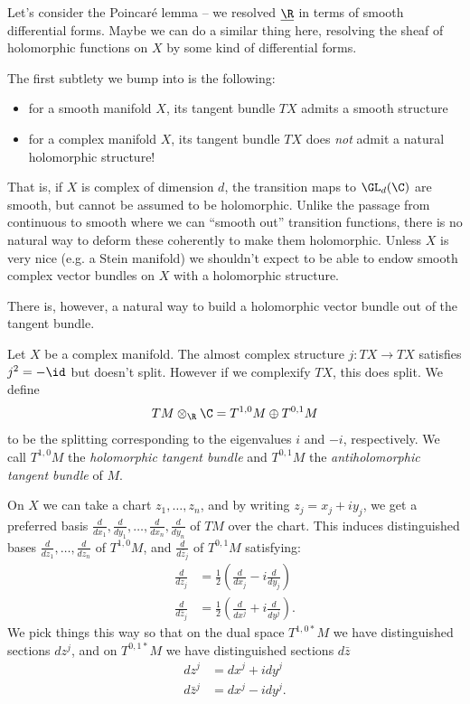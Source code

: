 \documentclass[11pt]{book}
\begin{document}
Let's consider the Poincar\'e lemma -- we resolved $\underline{\R}$ in terms of smooth differential forms. Maybe we can do a similar thing here, resolving the sheaf of holomorphic functions on $X$ by some kind of differential forms.

The first subtlety we bump into is the following:
\begin{itemize}
    \item for a smooth manifold $X$, its tangent bundle $TX$ admits a smooth structure
    \item for a complex manifold $X$, its tangent bundle $TX$ does \emph{not} admit a natural holomorphic structure!
\end{itemize}

That is, if $X$ is complex of dimension $d$, the transition maps to $\GL_d(\C)$ are smooth, but cannot be assumed to be holomorphic. Unlike the passage from continuous to smooth where we can ``smooth out'' transition functions, there is no natural way to deform these coherently to make them holomorphic. Unless $X$ is very nice (e.g. a Stein manifold) we shouldn't expect to be able to endow smooth complex vector bundles on $X$ with a holomorphic structure.

There is, however, a natural way to build a holomorphic vector bundle out of the tangent bundle.

\begin{definition} Let $X$ be a complex manifold. The almost complex structure $j \colon TX \to TX$ satisfies $j^2 = -\id$ but doesn't split. However if we complexify $TX$, this does split. We define
\begin{align*}
    TM \otimes_\R\C = T^{1,0}M \oplus T^{0,1}M
\end{align*}
to be the splitting corresponding to the eigenvalues $i$ and $-i$, respectively. We call $T^{1,0}M$ the \emph{holomorphic tangent bundle} and $T^{0,1}M$ the \emph{antiholomorphic tangent bundle} of $M$.
\end{definition}

\begin{remark} On $X$ we can take a chart $z_1, \ldots, z_n$, and by writing $z_j = x_j + iy_j$, we get a preferred basis $\frac{d}{dx_1}, \frac{d}{dy_1}, \ldots, \frac{d}{dx_n}, \frac{d}{dy_n}$ of $TM$ over the chart. This induces distinguished bases $\frac{d}{dz_1}, \ldots, \frac{d}{dz_n}$ of $T^{1,0}M$, and $\frac{d}{d \bar{z}_j}$ of $T^{0,1}M$ satisfying: 
\begin{align*}
    \frac{d}{dz_j} &= \frac{1}{2}\left(\frac{d}{dx_j} - i \frac{d}{dy_j}\right) \\
    \frac{d}{d \bar{z}_j} &= \frac{1}{2} \left( \frac{d}{dx^j} + i \frac{d}{dy^j} \right).
\end{align*}
We pick things this way so that on the dual space $T^{1,0 \ast}M$ we have distinguished sections $dz^j$, and on $T^{0,1 \ast}M$ we have distinguished sections $d \bar{z}$
\begin{align*}
    dz^j &= dx^j + i dy^j \\
    d \bar{z}^j &= dx^j - i dy^j.
\end{align*}
\end{remark}
\end{document}

